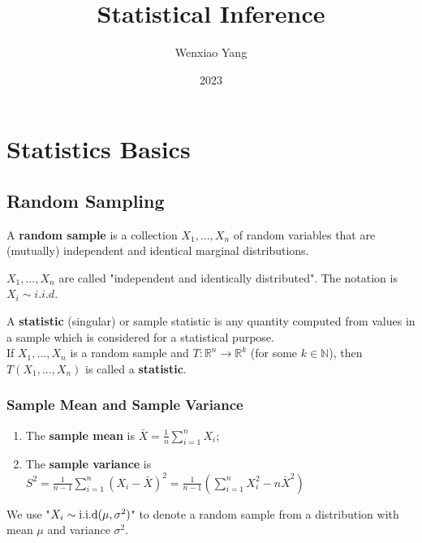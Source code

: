 \documentclass[11pt]{elegantbook}
\title{Statistical Inference}
\author{Wenxiao Yang}
\institute{Haas School of Business, University of California Berkeley}
\date{2023}
\begin{document}
\maketitle

\frontmatter
\tableofcontents

\mainmatter

\chapter{Statistics Basics}
\section{Random Sampling}
\begin{definition}
    \normalfont
    A \textbf{random sample} is a collection $X_1,...,X_n$ of random variables that are (mutually) independent and identical marginal distributions.

    $X_1,...,X_n$ are called "independent and identically distributed". The notation is $X_i\sim i.i.d. $
\end{definition}

\begin{definition}[Statistic]
    \normalfont
    A \textbf{statistic} (singular) or sample statistic is any quantity computed from values in a sample which is considered for a statistical purpose.\\
    If $X_1,...,X_n$ is a random sample and $T: \mathbb{R}^n \rightarrow \mathbb{R}^k$ (for some $k\in \mathbb{N}$), then $T(X_1,...,X_n)$ is called a \textbf{statistic}.
\end{definition}

\subsection{Sample Mean and Sample Variance}
\begin{definition}
    \normalfont
    \begin{enumerate}
        \item The \textbf{sample mean} is $\bar{X}=\frac{1}{n}\sum_{i=1}^n X_i$;
        \item The \textbf{sample variance} is $S^2=\frac{1}{n-1}\sum_{i=1}^n (X_i-\bar{X})^2=\frac{1}{n-1}(\sum_{i=1}^n X_i^2 - n\bar{X}^2)$
    \end{enumerate}
\end{definition}

\begin{note}
    We use "$X_i\sim \textnormal{i.i.d}(\mu,\sigma^2)$" to denote a random sample from a distribution with mean $\mu$ and variance $\sigma^2$.
\end{note}
\end{document}
